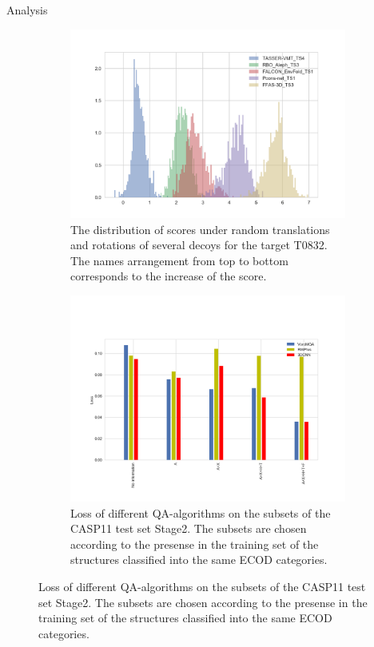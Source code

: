 \documentclass[final, unknownkeysallowed]{beamer}
\begin{document}
\begin{frame}{}
\begin{textblock}{39.0}
\begin{block}{Analysis}
\begin{figure}[H]
    \centering
    \begin{subfigure}{.5\textwidth}
    \includegraphics[width=\linewidth]{../draft/Fig/decoys_sampling_dist.png}
    \caption{The distribution of scores under random translations and rotations of several decoys for the target T0832. The 
    names arrangement from top to bottom corresponds to the increase of the score.}
    \label{Fig:DecoysScoreDistribution}
    \end{subfigure}%
    \begin{subfigure}{.5\textwidth}
    \includegraphics[width=\linewidth]{../draft/Fig/LossVsECOD.png}
    \caption{Loss of different QA-algorithms on the subsets of the CASP11 test set Stage2. The subsets are chosen according to the presense in the
    training set of the structures classified into the same ECOD categories.}
    \label{Fig:LossVsECOD}
    \end{subfigure}
\end{figure}


\end{block}
\end{textblock}
\end{frame}
\end{document}
